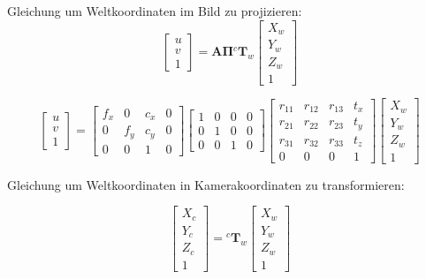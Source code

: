 Gleichung um Weltkoordinaten im Bild zu projizieren:
\[
\begin{bmatrix}
u \\ 
v \\ 
1
\end{bmatrix}
=
\mathbf{A} \mathbf{\Pi} {}^{c}\mathbf{T}_{w}
\begin{bmatrix}
X_w \\ 
Y_w \\ 
Z_w \\ 
1
\end{bmatrix}
\]

\[
\begin{bmatrix}
u \\ 
v \\ 
1
\end{bmatrix}
=
\begin{bmatrix}
f_x & 0   & c_x & 0 \\ 
0   & f_y & c_y & 0 \\ 
0   & 0   & 1   & 0
\end{bmatrix}
\begin{bmatrix}
1 & 0 & 0 & 0 \\ 
0 & 1 & 0 & 0 \\ 
0 & 0 & 1 & 0
\end{bmatrix}
\begin{bmatrix}
r_{11} & r_{12} & r_{13} & t_x \\ 
r_{21} & r_{22} & r_{23} & t_y \\ 
r_{31} & r_{32} & r_{33} & t_z \\ 
0      & 0      & 0      & 1
\end{bmatrix}
\begin{bmatrix}
X_w \\ 
Y_w \\ 
Z_w \\ 
1
\end{bmatrix}
\]

Gleichung um Weltkoordinaten in Kamerakoordinaten zu transformieren:

\[
\begin{bmatrix}
X_c \\ 
Y_c \\ 
Z_c \\ 
1
\end{bmatrix}
=
{}^{c}\mathbf{T}_{w}
\begin{bmatrix}
X_w \\ 
Y_w \\ 
Z_w \\ 
1
\end{bmatrix}
\]

